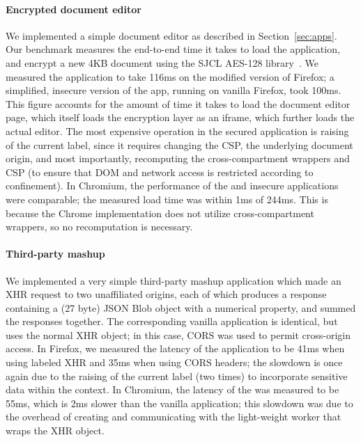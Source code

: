 \paragraph{Encrypted document editor}

We implemented a simple document editor as described in
Section~\ref{sec:apps}.
%
Our benchmark measures the end-to-end time it takes to load the
application, and encrypt a new 4KB document using
the SJCL AES-128 library~\cite{sjcl}.
%
We measured the \sys{} application to take 116ms on the modified
version of Firefox; a simplified, insecure version of the app,
running on vanilla Firefox, took 100ms.
%
This figure accounts for the amount of time it takes to
load the document editor page, which itself loads the encryption layer
as an iframe, which further loads the actual editor.
%
The most expensive operation in the secured application
is raising of the current label, since it requires changing the CSP, the
underlying document origin, and most importantly, recomputing the
cross-compartment wrappers and CSP (to ensure that DOM and network
access is restricted according to confinement).
%
In Chromium, the performance of the \sys{} and insecure applications
were comparable; the measured load time was within 1ms of 244ms.
%
This is because the Chrome implementation does not utilize cross-compartment
wrappers, so no recomputation is necessary.


\paragraph{Third-party mashup}

We implemented a very simple third-party mashup application which
made an XHR request to two unaffiliated origins, each
of which produces a response containing a (27 byte) JSON Blob
object with a numerical property, and summed the responses
together.
%
The corresponding vanilla application is identical, but uses the normal
XHR object; in this case, CORS was used to permit cross-origin access.
%
In Firefox, we measured the latency of the application to be 41ms when
using labeled XHR and 35ms when using CORS headers; the slowdown is once
again due to the raising of the current label (two times) to incorporate
sensitive data within the context.
%
In Chromium, the latency of the \sys{} was measured to be 55ms, 
which is 2ms slower than the vanilla application; this
slowdown was due to the overhead of creating and communicating with the light-weight worker
that wraps the XHR object.

